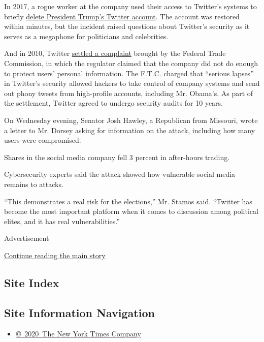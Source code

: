 In 2017, a rogue worker at the company used their access to Twitter's
systems to briefly
\href{https://www.nytimes3xbfgragh.onion/2017/11/03/technology/trump-twitter-deleted.html}{delete
President Trump's Twitter account}. The account was restored within
minutes, but the incident raised questions about Twitter's security as
it serves as a megaphone for politicians and celebrities.

And in 2010, Twitter
\href{https://www.ftc.gov/news-events/press-releases/2010/06/twitter-settles-charges-it-failed-protect-consumers-personal}{settled
a complaint} brought by the Federal Trade Commission, in which the
regulator claimed that the company did not do enough to protect users'
personal information. The F.T.C. charged that ``serious lapses'' in
Twitter's security allowed hackers to take control of company systems
and send out phony tweets from high-profile accounts, including Mr.
Obama's. As part of the settlement, Twitter agreed to undergo security
audits for 10 years.

On Wednesday evening, Senator Josh Hawley, a Republican from Missouri,
wrote a letter to Mr. Dorsey asking for information on the attack,
including how many users were compromised.

Shares in the social media company fell 3 percent in after-hours
trading.

Cybersecurity experts said the attack showed how vulnerable social media
remains to attacks.

``This demonstrates a real risk for the elections,'' Mr. Stamos said.
``Twitter has become the most important platform when it comes to
discussion among political elites, and it has real vulnerabilities.''

Advertisement

\protect\hyperlink{after-bottom}{Continue reading the main story}

\hypertarget{site-index}{%
\subsection{Site Index}\label{site-index}}

\hypertarget{site-information-navigation}{%
\subsection{Site Information
Navigation}\label{site-information-navigation}}

\begin{itemize}
\tightlist
\item
  \href{https://help.nytimes3xbfgragh.onion/hc/en-us/articles/115014792127-Copyright-notice}{©~2020~The
  New York Times Company}
\end{itemize}

